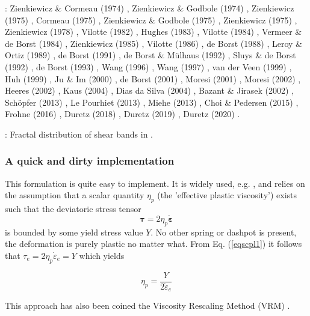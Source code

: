 
\Literature: 
Zienkiewicz \& Cormeau (1974) \cite{zico74,zico74b},
Zienkiewicz \& Godbole (1974) \cite{zigo74},
Zienkiewicz (1975) \cite{zien75},
Cormeau (1975) \cite{corm75},
Zienkiewicz \& Godbole (1975) \cite{zigo75},
Zienkiewicz \etal (1975) \cite{zihl75},
Zienkiewicz \etal (1978) \cite{zijo78},
Vilotte \etal (1982) \cite{vidm82},
Hughes (1983) \cite{hugh83},
Vilotte \etal (1984) \cite{vidm84},
Vermeer \& de Borst (1984) \cite{vede84},
Zienkiewicz \etal (1985) \cite{zivt85},
Vilotte \etal (1986) \cite{vimd86},
de Borst (1988) \cite{debo88},
Leroy \& Ortiz (1989) \cite{leor89},
de Borst (1991) \cite{debo91},
de Borst \& M{\"u}lhaus (1992) \cite{demu92},
Sluys \& de Borst (1992) \cite{slde92},
de Borst \etal (1993) \cite{desm93},
Wang \etal (1996) \cite{wasd96},
Wang \etal (1997) \cite{wasd97},
van der Veen \etal (1999) \cite{vavd99},
Huh \etal (1999) \cite{huhy99},
Ju \& Im (2000) \cite{juim00},
de Borst (2001) \cite{debo01},
Moresi \etal (2001) \cite{modm01},
Moresi \etal (2002) \cite{modm02},
Heeres \etal (2002) \cite{hesd02},
Kaus \etal (2004) \cite{kaps04},
Dias da Silva \etal (2004) \cite{dias04},
Bazant \& Jirasek (2002) \cite{baji02},
Sch{\"o}pfer \etal (2013) \cite{sccm13},
Le Pourhiet (2013) \cite{lepo13},
Miehe \etal (2013) \cite{miam13},
Choi \& Pedersen (2015) \cite{chpe15},
Frohne \etal (2016) \cite{frhb16},
Duretz \etal (2018) \cite{dusd18},
Duretz \etal (2019) \cite{dudl19},
Duretz \etal (2020) \cite{dudy20}.


\Literature: 
Fractal distribution of shear bands in \cite{pohp94,pohe94}.





\subsubsection{A quick and dirty implementation}

This formulation is quite easy to implement. It is widely used, e.g. \cite{will92,thfb08,spmw16}, and relies on the assumption that 
a scalar quantity $\eta_p$ (the 'effective plastic viscosity') exists such that the deviatoric stress tensor 
\begin{equation}
{\bm \tau}=2\eta_p \dot{\bm\varepsilon} \label{eqscpl1}
\end{equation}
is bounded by some yield stress value $Y$. No other spring or dashpot is present, the deformation is purely plastic no 
matter what.
From Eq. (\ref{eqscpl1}) it follows that ${\tau}_{e}= 2\eta_p \dot{\varepsilon}_{e}=Y$ which yields
\begin{mdframed}[backgroundcolor=blue!5]
\[
\eta_p = \frac{Y}{2 \dot{\varepsilon}_{e}}
\]
\end{mdframed}
This approach has also been coined the Viscosity Rescaling Method (VRM) \cite{kacha04}. 
 

